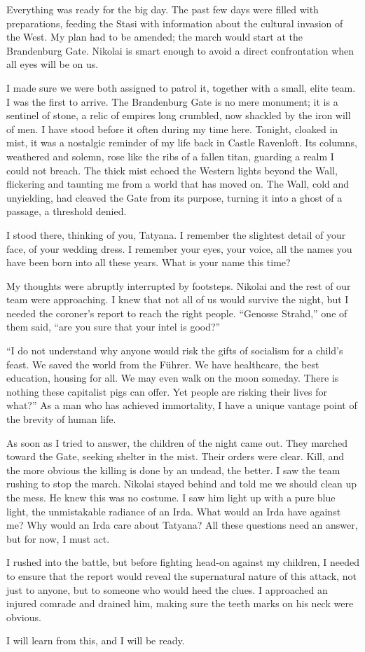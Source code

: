
Everything was ready for the big day.
The past few days were filled with preparations, feeding the Stasi with information about the cultural invasion of the West.
My plan had to be amended; the march would start at the Brandenburg Gate.
Nikolai is smart enough to avoid a direct confrontation when all eyes will be on us.

I made sure we were both assigned to patrol it, together with a small, elite team.
I was the first to arrive.
The Brandenburg Gate is no mere monument; it is a sentinel of stone, a relic of empires long crumbled, now shackled by the iron will of men.
I have stood before it often during my time here.
Tonight, cloaked in mist, it was a nostalgic reminder of my life back in Castle Ravenloft.
Its columns, weathered and solemn, rose like the ribs of a fallen titan, guarding a realm I could not breach.
The thick mist echoed the Western lights beyond the Wall, flickering and taunting me from a world that has moved on.
The Wall, cold and unyielding, had cleaved the Gate from its purpose, turning it into a ghost of a passage, a threshold denied.

I stood there, thinking of you, Tatyana.
I remember the slightest detail of your face, of your wedding dress.
I remember your eyes, your voice, all the names you have been born into all these years.
What is your name this time?

My thoughts were abruptly interrupted by footsteps.
Nikolai and the rest of our team were approaching.
I knew that not all of us would survive the night, but I needed the coroner's report to reach the right people.
``Genosse Strahd,'' one of them said, ``are you sure that your intel is good?''

``I do not understand why anyone would risk the gifts of socialism for a child's feast.
We saved the world from the Führer.
We have healthcare, the best education, housing for all.
We may even walk on the moon someday.
There is nothing these capitalist pigs can offer.
Yet people are risking their lives for what?''
As a man who has achieved immortality, I have a unique vantage point of the brevity of human life.

As soon as I tried to answer, the children of the night came out.
They marched toward the Gate, seeking shelter in the mist.
Their orders were clear.
Kill, and the more obvious the killing is done by an undead, the better.
I saw the team rushing to stop the march.
Nikolai stayed behind and told me we should clean up the mess.
He knew this was no costume.
I saw him light up with a pure blue light, the unmistakable radiance of an Irda.
What would an Irda have against me? Why would an Irda care about Tatyana? All these questions need an answer, but for now, I must act.

I rushed into the battle, but before fighting head-on against my children, I needed to ensure that the report would reveal the supernatural nature of this attack, not just to anyone, but to someone who would heed the clues.
I approached an injured comrade and drained him, making sure the teeth marks on his neck were obvious.

I will learn from this, and I will be ready.

\vfill\newpage
